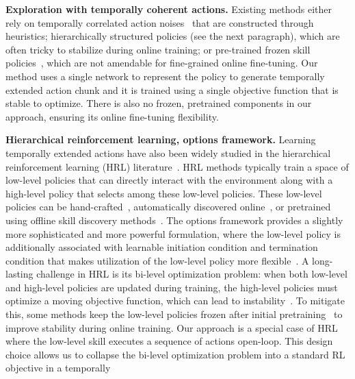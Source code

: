 \textbf{Exploration with temporally coherent actions.}
Existing methods either rely on temporally correlated action noises~\citep{lillicrap2015continuous} that are constructed through heuristics; hierarchically structured policies (see the next paragraph), which are often tricky to stabilize during online training; or pre-trained frozen skill policies~\citep{pertsch2021accelerating, wilcoxson2024leveraging}, which are not amendable for fine-grained online fine-tuning. Our method uses a single network to represent the policy to generate temporally extended action chunk and it is trained using a single objective function that is stable to optimize. There is also no frozen, pretrained components in our approach, ensuring its online fine-tuning flexibility.


\textbf{Hierarchical reinforcement learning, options framework.} Learning temporally extended actions have also been widely studied in the hierarchical reinforcement learning (HRL) literature~\citep{dayan1992feudal, dietterich2000hierarchical, vezhnevets2016strategic, daniel2016hierarchical, kulkarni2016hierarchical, vezhnevets2017feudal, peng2017deeploco, riedmiller2018learning, nachum2018data, ajay2020opal, shankar2020learning, pertsch2021accelerating, gehring2021hierarchical, xie2021latent}. HRL methods typically train a space of low-level policies that can directly interact with the environment along with a high-level policy that selects among these low-level policies. These low-level policies can be hand-crafted~\citep{dalal2021accelerating}, automatically discovered online~\citep{dietterich2000hierarchical, kulkarni2016hierarchical, vezhnevets2016strategic, vezhnevets2017feudal, nachum2018data}, or pretrained using offline skill discovery methods~\citep{paraschos2013probabilistic,merel2018neural,shankar2020learning, ajay2020opal, singh2020parrot, pertsch2021accelerating, touati2022does, nasiriany2022learning, hu2023unsupervised, frans2024unsupervised, chen2024self, park2024foundation}. The options framework provides a slightly more sophisticated and more powerful formulation, where the low-level policy is additionally associated with learnable initiation condition and termination condition that makes utilization of the low-level policy more flexible~\citep{sutton1999between, menache2002q, chentanez2004intrinsically, mannor2004dynamic, csimcsek2004using, csimcsek2007betweenness, konidaris2011autonomous, daniel2016hierarchical, srinivas2016option, oh2017value, fox2017multi, bacon2017option, kim2019variational, bagaria2019option, bagaria2024effectively, de2025learning}.  A long-lasting challenge in HRL is its bi-level optimization problem: when both low-level and high-level policies are updated during training, the high-level policies must optimize a moving objective function, which can lead to instability~\citep{nachum2018data}. To mitigate this, some methods keep the low-level policies frozen after initial pretraining~\citep{ajay2020opal, pertsch2021accelerating, wilcoxson2024leveraging} to improve stability during online training. Our approach is a special case of HRL where the low-level skill executes a sequence of actions open-loop. This design choice allows us to collapse the bi-level optimization problem into a standard RL objective in a temporally 